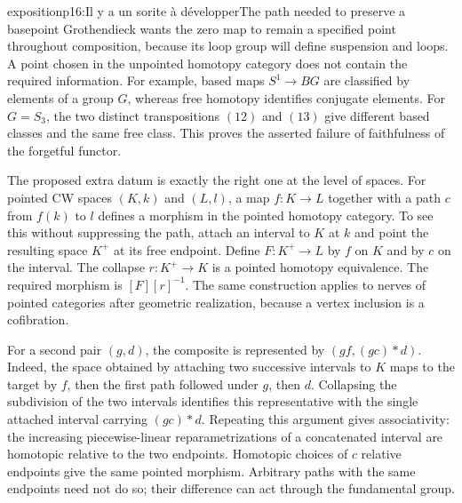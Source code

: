 \begin{dcomment}{exposition}{p16:Il y a un sorite à développer}{The path needed to preserve a basepoint}
Grothendieck wants the zero map to remain a specified point throughout composition, because its loop group will define suspension and loops. A point chosen in the unpointed homotopy category does not contain the required information. For example, based maps $S^1\to BG$ are classified by elements of a group $G$, whereas free homotopy identifies conjugate elements. For $G=S_3$, the two distinct transpositions $(12)$ and $(13)$ give different based classes and the same free class. This proves the asserted failure of faithfulness of the forgetful functor.

The proposed extra datum is exactly the right one at the level of spaces. For pointed CW spaces $(K,k)$ and $(L,l)$, a map $f:K\to L$ together with a path $c$ from $f(k)$ to $l$ defines a morphism in the pointed homotopy category. To see this without suppressing the path, attach an interval to $K$ at $k$ and point the resulting space $K^+$ at its free endpoint. Define $F:K^+\to L$ by $f$ on $K$ and by $c$ on the interval. The collapse $r:K^+\to K$ is a pointed homotopy equivalence. The required morphism is $[F][r]^{-1}$. The same construction applies to nerves of pointed categories after geometric realization, because a vertex inclusion is a cofibration.

For a second pair $(g,d)$, the composite is represented by $(gf,(gc)*d)$. Indeed, the space obtained by attaching two successive intervals to $K$ maps to the target by $f$, then the first path followed under $g$, then $d$. Collapsing the subdivision of the two intervals identifies this representative with the single attached interval carrying $(gc)*d$. Repeating this argument gives associativity: the increasing piecewise-linear reparametrizations of a concatenated interval are homotopic relative to the two endpoints. Homotopic choices of $c$ relative endpoints give the same pointed morphism. Arbitrary paths with the same endpoints need not do so; their difference can act through the fundamental group.


\end{dcomment}
